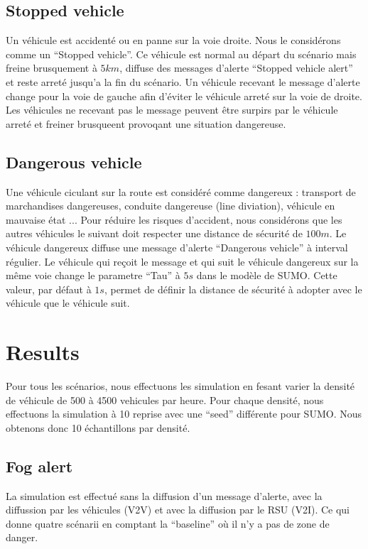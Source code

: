 \documentclass[a4paper,10pt]{report}
\begin{document}
\subsection{Stopped vehicle}

Un véhicule est accidenté ou en panne sur la voie droite. Nous le considérons comme un ``Stopped vehicle''. Ce véhicule est normal au départ du scénario mais freine brusquement à $5 km$, diffuse des messages d'alerte ``Stopped vehicle alert'' et reste arreté jusqu'a la fin du scénario. Un véhicule recevant le message d'alerte change pour la voie de gauche afin d'éviter le véhicule arreté sur la voie de droite. Les véhicules ne recevant pas le message peuvent être surpirs par le véhicule arreté et freiner brusqueent provoqant une situation dangereuse.

\subsection{Dangerous vehicle}

Une véhicule ciculant sur la route est considéré comme dangereux : transport de marchandises dangereuses, conduite dangereuse (line diviation), véhicule en mauvaise état ... Pour réduire les risques d'accident, nous considérons que les autres véhicules le suivant doit respecter une distance de sécurité de $100 m$. Le véhicule dangereux diffuse une message d'alerte ``Dangerous vehicle'' à interval régulier. Le véhicule qui reçoit le message et qui suit le véhicule dangereux sur la même voie change le parametre ``Tau'' à $5 s$ dans le modèle de SUMO. Cette valeur, par défaut à $1 s$, permet de définir la distance de sécurité à adopter avec le véhicule que le véhicule suit. 

\section{Results}

Pour tous les scénarios, nous effectuons les simulation en fesant varier la densité de véhicule de 500 à 4500 vehicules par heure. Pour chaque densité, nous effectuons la simulation à 10 reprise avec une ``seed'' différente pour SUMO. Nous obtenons donc 10 échantillons par densité.

\subsection{Fog alert}

La simulation est effectué sans la diffusion d'un message d'alerte, avec la diffussion par les véhicules (V2V) et avec la diffusion par le RSU (V2I). Ce qui donne quatre scénarii en comptant la ``baseline'' où il n'y a pas de zone de danger.
\end{document}
